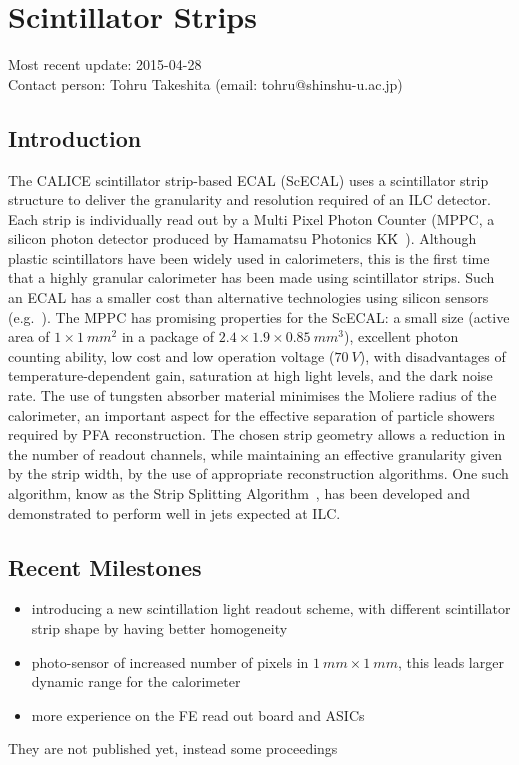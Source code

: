 \section{Scintillator Strips}
Most recent update: 2015-04-28 \\
Contact person: Tohru Takeshita (email: tohru@shinshu-u.ac.jp)
\subsection{Introduction}

The CALICE scintillator strip-based ECAL (ScECAL) uses a scintillator  strip
structure to deliver the granularity and resolution required of an ILC detector.
Each strip is individually read out by a Multi Pixel Photon Counter (MPPC, a
silicon photon detector produced by Hamamatsu Photonics K\.K\.~\cite{Gomi:2007zz}). Although
plastic scintillators have been widely used in calorimeters, this is the first
time that a highly granular calorimeter has been made using scintillator strips.
Such an ECAL has a smaller cost than alternative technologies using silicon
sensors (e.g.~\cite{1748-0221-3-08-P08001}). The MPPC has promising properties for the ScECAL: a small
size (active area of $1\times\SI{1}{mm^2}$ in a package of $2.4 \times 1.9 \times \SI{0.85}{mm^3}$), excellent
photon counting ability, low cost and low operation voltage ($\SI{70}{V}$), with
disadvantages of temperature-dependent gain, saturation at high light levels,
and the dark noise rate. The use of tungsten absorber material
minimises the Moliere radius of the calorimeter, an important aspect for the
effective separation of particle showers required by PFA reconstruction. The
chosen strip geometry allows a reduction in the number of readout channels,
while maintaining an effective granularity given by the strip width, by the use
of appropriate reconstruction algorithms. One such algorithm, know as the Strip
Splitting Algorithm~\cite{Kotera2015}, has been developed and demonstrated to perform well in
jets expected at ILC.

\subsection{Recent Milestones}
\begin{itemize}
	\item introducing a new scintillation light readout scheme, with different scintillator strip shape by having better homogeneity
	\item photo-sensor of increased number of pixels in $\SI{1}{mm}\times\SI{1}{mm}$, this leads larger dynamic range for the calorimeter
	\item more experience on the FE read out board and ASICs
\end{itemize}
They are not published yet, instead some proceedings

